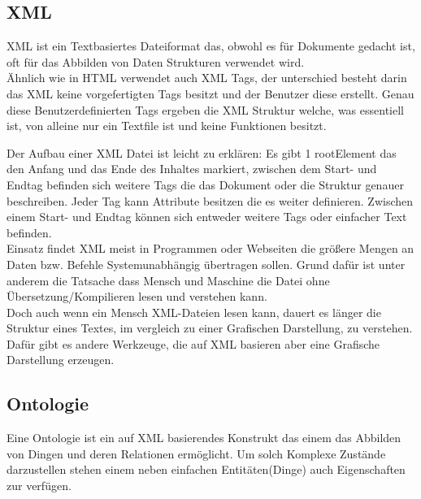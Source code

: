 \subsection{XML}
XML ist ein Textbasiertes Dateiformat das, obwohl es für Dokumente gedacht ist, oft für das Abbilden von Daten Strukturen verwendet wird.
\\
Ähnlich wie in HTML verwendet auch XML Tags, der unterschied besteht darin das XML keine vorgefertigten Tags besitzt und der Benutzer diese erstellt. Genau diese Benutzerdefinierten Tags ergeben die XML Struktur welche, was essentiell ist, von alleine nur ein Textfile ist und keine Funktionen besitzt.
\newpage

Der Aufbau einer XML Datei ist leicht zu erklären: Es gibt 1 rootElement das den Anfang und das Ende des Inhaltes markiert, zwischen dem Start- und Endtag befinden sich weitere Tags die das Dokument oder die Struktur genauer beschreiben. Jeder Tag kann Attribute besitzen die es weiter definieren. Zwischen einem Start- und Endtag können sich entweder weitere Tags oder einfacher Text befinden.
\\
Einsatz findet XML meist in Programmen oder Webseiten die größere Mengen an Daten bzw. Befehle Systemunabhängig übertragen sollen. Grund dafür ist unter anderem die Tatsache dass Mensch und Maschine die Datei ohne Übersetzung/Kompilieren lesen und verstehen kann.\\
Doch auch wenn ein Mensch XML-Dateien lesen kann, dauert es länger die Struktur eines Textes, im vergleich zu einer Grafischen Darstellung, zu verstehen.\\ 
Dafür gibt es andere Werkzeuge, die auf XML basieren aber eine Grafische Darstellung erzeugen.
\subsection{Ontologie}
Eine Ontologie ist ein auf XML basierendes Konstrukt das einem das Abbilden von Dingen und deren Relationen ermöglicht. Um solch Komplexe Zustände darzustellen stehen einem neben einfachen Entitäten(Dinge) auch Eigenschaften zur verfügen.

